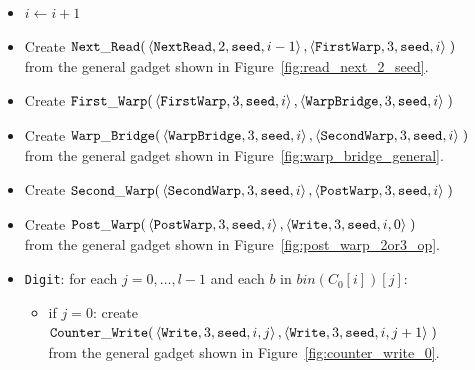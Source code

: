 \begin{itemize}
    \item $i \gets i + 1$

    \item Create
    $\begin{aligned}[t]
        {\tt Next\_Read}(&\left\langle {\tt NextRead},  2, {\tt seed}, i - 1 \right\rangle,
                   \left\langle {\tt FirstWarp}, 3, {\tt seed}, i     \right\rangle \;)
    \end{aligned}$\\ from the general gadget shown in Figure~\ref{fig:read_next_2_seed}.

    \item Create
    $\begin{aligned}[t]
        {\tt First\_Warp}(&\left\langle {\tt FirstWarp},  3, {\tt seed}, i \right\rangle,
                    \left\langle {\tt WarpBridge}, 3, {\tt seed}, i \right\rangle \;)
    \end{aligned}$

    \item Create
    $\begin{aligned}[t]
        {\tt Warp\_Bridge}(&\left\langle {\tt WarpBridge}, 3, {\tt seed}, i \right\rangle,
                     \left\langle {\tt SecondWarp}, 3, {\tt seed}, i \right\rangle \;)
    \end{aligned}$\\ from the general gadget shown in Figure~\ref{fig:warp_bridge_general}.

    \item Create
    $\begin{aligned}[t]
        {\tt Second\_Warp}(&\left\langle {\tt SecondWarp}, 3, {\tt seed}, i  \right\rangle,
                     \left\langle {\tt PostWarp},   3, {\tt seed}, i  \right\rangle \;)
    \end{aligned}$

    \item Create
    $\begin{aligned}[t]
        {\tt Post\_Warp}(&\left\langle {\tt PostWarp}, 3, {\tt seed}, i    \right\rangle,
                   \left\langle {\tt Write},    3, {\tt seed}, i, 0 \right\rangle \;)
    \end{aligned}$\\from the general gadget shown in Figure~\ref{fig:post_warp_2or3_op}.


    \item {\tt Digit}: for each $j=0,\ldots,l-1$ and each $b$ in $bin(C_0[i])[j]$:
    \begin{itemize}
        \item if $j = 0$: create
        $\begin{aligned}[t]
            {\tt Counter\_Write}(&\left\langle {\tt Write}, 3, {\tt seed}, i, j \right\rangle, \left\langle {\tt Write}, 3, {\tt seed}, i, j + 1 \right\rangle \;)
        \end{aligned}$\\from the general gadget shown in Figure~\ref{fig:counter_write_0}.


\end{itemize}
\end{itemize}
